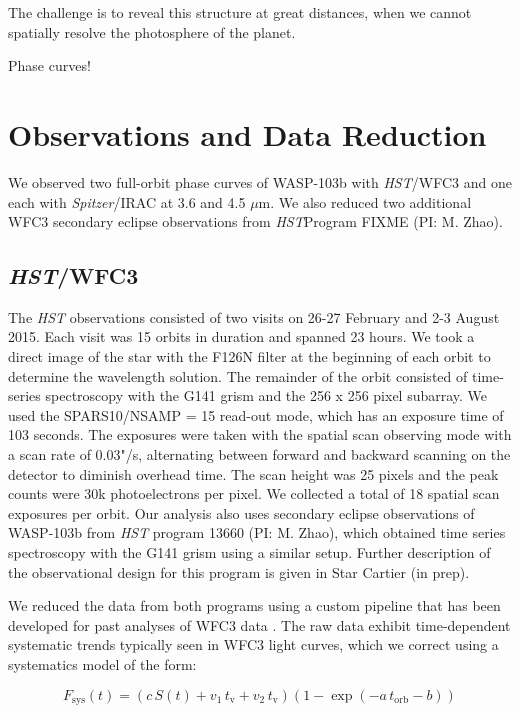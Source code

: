 \documentclass[twocolumn]{aastex61}
\newcommand{\project}[1]{\textsl{#1}}
\newcommand{\HST}{\project{HST}}
\newcommand{\Spitzer}{\project{Spitzer}}
\begin{document}
The challenge is to reveal this structure at great distances, when we cannot spatially resolve the photosphere of the planet.

Phase curves! 

\section{Observations and Data Reduction}
We observed two full-orbit phase curves of WASP-103b with \HST/WFC3 and one each with \Spitzer/IRAC at 3.6 and 4.5 $\mu$m. We also reduced two additional WFC3 secondary eclipse observations from \HST Program FIXME (PI: M. Zhao).

\subsection{\HST/WFC3}
The \emph{HST} observations consisted of two visits on 26-27 February and 2-3 August 2015. Each visit was 15 orbits in duration and spanned 23 hours. We took a direct image of the star with the F126N filter at the beginning of each orbit to determine the wavelength solution. The remainder of the orbit consisted of time-series spectroscopy with the G141 grism and the 256 x 256 pixel subarray. We used the SPARS10/NSAMP = 15 read-out mode, which has an exposure time of 103 seconds. The exposures were taken with the spatial scan observing mode with a scan rate of 0.03"/s, alternating between forward and backward scanning on the detector to diminish overhead time. The scan height was 25 pixels and the peak counts were 30k photoelectrons per pixel. We collected a total of 18 spatial scan exposures per orbit.  Our analysis also uses secondary eclipse observations of WASP-103b from \emph{HST} program 13660 (PI: M. Zhao), which obtained time series spectroscopy with the G141 grism using a similar setup. Further description of the observational design for this program is given in Star Cartier (in prep).

We reduced the data from both programs using a custom pipeline that has been developed for past analyses of WFC3 data \citep[for details see][]{kreidberg14a, kreidberg14b, kreidberg15a}. The raw data exhibit time-dependent systematic trends typically seen in WFC3 light curves, which we correct using a systematics model of the form:

\begin{equation}
 F_\mathrm{sys}(t) = (c\,S(t) + v_1\,t_\mathrm{v} + v_2\,t_\mathrm{v})(1 - \exp(-a\,t_\mathrm{orb} - b))
\end{equation}
\end{document}
